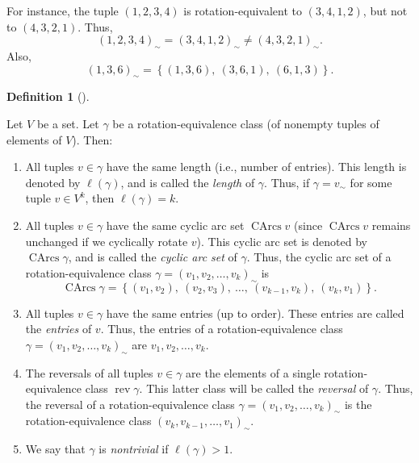 \documentclass[numbers=enddot,12pt,final,onecolumn,notitlepage]{scrartcl}%
\numberwithin{exer}{section}
\theoremstyle{definition}
\newtheorem{defi}[theo]{Definition}
\newenvironment{definition}[1][]
{\begin{defi}[#1]\begin{leftbar}}
{\end{leftbar}\end{defi}}
\begin{document}
For instance, the tuple $\left(  1,2,3,4\right)  $ is rotation-equivalent to
$\left(  3,4,1,2\right)  $, but not to $\left(  4,3,2,1\right)  $. Thus,%
\[
\left(  1,2,3,4\right)  _{\sim}=\left(  3,4,1,2\right)  _{\sim}\neq\left(
4,3,2,1\right)  _{\sim}.
\]
Also,%
\[
\left(  1,3,6\right)  _{\sim}=\left\{  \left(  1,3,6\right)  ,\ \left(
3,6,1\right)  ,\ \left(  6,1,3\right)  \right\}  .
\]


\begin{definition}
\label{def.reqc.features}Let $V$ be a set. Let $\gamma$ be a
rotation-equivalence class (of nonempty tuples of elements of $V$). Then:

\begin{enumerate}
\item[\textbf{(a)}] All tuples $v\in\gamma$ have the same length (i.e., number
of entries). This length is denoted by $\ell\left(  \gamma\right)  $, and is
called the \emph{length} of $\gamma$. Thus, if $\gamma=v_{\sim}$ for some
tuple $v\in V^{k}$, then $\ell\left(  \gamma\right)  =k$.

\item[\textbf{(b)}] All tuples $v\in\gamma$ have the same cyclic arc set
$\operatorname*{CArcs}v$ (since $\operatorname*{CArcs}v$ remains unchanged if
we cyclically rotate $v$). This cyclic arc set is denoted by
$\operatorname*{CArcs}\gamma$, and is called the \emph{cyclic arc set} of
$\gamma$. Thus, the cyclic arc set of a rotation-equivalence class
$\gamma=\left(  v_{1},v_{2},\ldots,v_{k}\right)  _{\sim}$ is%
\[
\operatorname*{CArcs}\gamma=\left\{  \left(  v_{1},v_{2}\right)  ,\ \left(
v_{2},v_{3}\right)  ,\ \ldots,\ \left(  v_{k-1},v_{k}\right)  ,\ \left(
v_{k},v_{1}\right)  \right\}  .
\]


\item[\textbf{(c)}] All tuples $v\in\gamma$ have the same entries (up to
order). These entries are called the \emph{entries} of $v$. Thus, the entries
of a rotation-equivalence class $\gamma=\left(  v_{1},v_{2},\ldots
,v_{k}\right)  _{\sim}$ are $v_{1},v_{2},\ldots,v_{k}$.

\item[\textbf{(d)}] The reversals of all tuples $v\in\gamma$ are the elements
of a single rotation-equivalence class $\operatorname*{rev}\gamma$. This
latter class will be called the \emph{reversal} of $\gamma$. Thus, the
reversal of a rotation-equivalence class $\gamma=\left(  v_{1},v_{2}%
,\ldots,v_{k}\right)  _{\sim}$ is the rotation-equivalence class $\left(
v_{k},v_{k-1},\ldots,v_{1}\right)  _{\sim}$.

\item[\textbf{(e)}] We say that $\gamma$ is \emph{nontrivial} if $\ell\left(
\gamma\right)  >1$.
\end{enumerate}
\end{definition}
\end{document}
